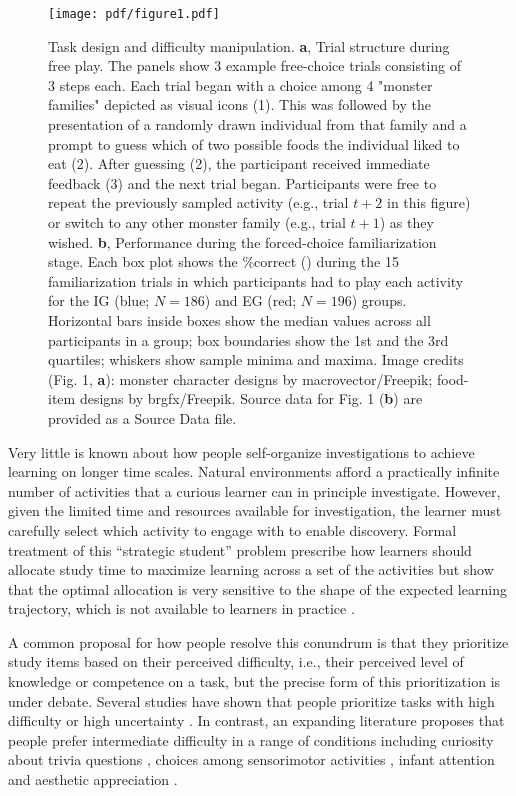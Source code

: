     \begin{figure*}[b!]
        \centering
        \texttt{[image: pdf/figure1.pdf]}
        \caption{Task design and difficulty manipulation. \textbf{a}, Trial structure during free play. The panels show 3 example free-choice trials consisting of 3 steps each. Each trial began with a choice among 4 "monster families" depicted as visual icons (1). This was followed by the presentation of a randomly drawn individual from that family and a prompt to guess which of two possible foods the individual liked to eat (2). After guessing (2), the participant received immediate feedback (3) and the next trial began. Participants were free to repeat the previously sampled activity (e.g., trial $t+2$ in this figure) or switch to any other monster family (e.g., trial $t+1$) as they wished. \textbf{b}, Performance during the forced-choice familiarization stage. Each box plot shows the \%correct ({\PC}) during the 15 familiarization trials in which participants had to play each activity for the IG (blue; $N=186$) and EG (red; $N=196$) groups. Horizontal bars inside boxes show the median values across all participants in a group; box boundaries show the 1st and the 3rd quartiles; whiskers show sample minima and maxima. Image credits (Fig. 1, \textbf{a}): monster character designs by macrovector/Freepik; food-item designs by brgfx/Freepik. Source data for Fig. 1 (\textbf{b}) are provided as a Source Data file.}
        \label{fig:1}
    \end{figure*}
    
    Very little is known about how people self-organize investigations to achieve  learning on longer time scales. Natural environments afford a practically infinite number of activities that a curious learner can in principle investigate. However, given the limited time and resources available for investigation, the learner  must carefully select which activity to engage with to enable discovery. Formal treatment of this “strategic student” problem prescribe how learners should allocate study time to maximize learning across a set of the activities \cite{son2006metacognitive,lopes2012strategic} but show that the optimal allocation is very sensitive to the shape of the expected learning trajectory, which is not available to learners in practice \cite{son2006metacognitive}. 
     
    A common proposal for how people resolve this conundrum is that they prioritize study items based on their perceived difficulty, i.e., their perceived level of knowledge or competence on a task, but the precise form of this prioritization is under debate. Several studies have shown  that people prioritize tasks with high difficulty or high uncertainty \cite{loewenstein1994psychology,schulz2019structured}. In contrast, an expanding literature proposes that people prefer intermediate difficulty \cite{berlyne1960conflict} in a range of conditions including curiosity about trivia questions \cite{kang2009wick,baranes2015eye}, choices among sensorimotor activities \cite{baranes2014effects}, infant attention \cite{kidd2012goldilocks} and aesthetic appreciation \cite{tsutsui2011complexity,gold2019predictability}.
     
